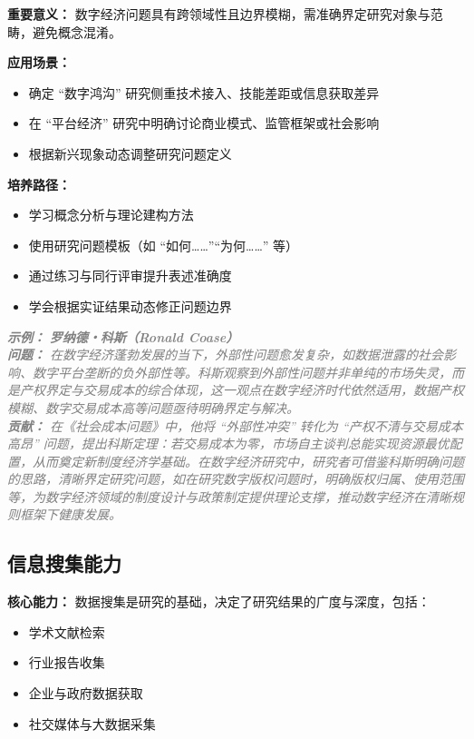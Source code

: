 \documentclass[lang=cn,12pt,a4paper]{elegantpaper}
\newcommand{\skillexample}[1]{\smallskip\noindent\textcolor{gray}{\textit{\footnotesize\textbf{示例：}} \textit{\footnotesize #1}}}
\begin{document}
\textbf {重要意义：} 数字经济问题具有跨领域性且边界模糊，需准确界定研究对象与范畴，避免概念混淆。

\textbf {应用场景：}
\begin {itemize}
\item 确定 “数字鸿沟” 研究侧重技术接入、技能差距或信息获取差异
\item 在 “平台经济” 研究中明确讨论商业模式、监管框架或社会影响
\item 根据新兴现象动态调整研究问题定义
\end {itemize}

\textbf {培养路径：}
\begin {itemize}
\item 学习概念分析与理论建构方法
\item 使用研究问题模板（如 “如何……”“为何……” 等）
\item 通过练习与同行评审提升表述准确度
\item 学会根据实证结果动态修正问题边界
\end {itemize}

\skillexample {
\textbf {罗纳德・科斯（Ronald Coase）}\\
\textbf {问题：} 在数字经济蓬勃发展的当下，外部性问题愈发复杂，如数据泄露的社会影响、数字平台垄断的负外部性等。科斯观察到外部性问题并非单纯的市场失灵，而是产权界定与交易成本的综合体现，这一观点在数字经济时代依然适用，数据产权模糊、数字交易成本高等问题亟待明确界定与解决。\\
\textbf {贡献：} 在《社会成本问题》中，他将 “外部性冲突” 转化为 “产权不清与交易成本高昂” 问题，提出科斯定理：若交易成本为零，市场自主谈判总能实现资源最优配置，从而奠定新制度经济学基础。在数字经济研究中，研究者可借鉴科斯明确问题的思路，清晰界定研究问题，如在研究数字版权问题时，明确版权归属、使用范围等，为数字经济领域的制度设计与政策制定提供理论支撑，推动数字经济在清晰规则框架下健康发展。
}

\subsection {信息搜集能力}\label {sec:data_collection}
\textbf {核心能力：} 数据搜集是研究的基础，决定了研究结果的广度与深度，包括：
\begin {itemize}
\item 学术文献检索
\item 行业报告收集
\item 企业与政府数据获取
\item 社交媒体与大数据采集
\end {itemize}
\end{document}
